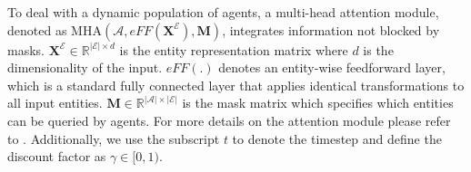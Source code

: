 \documentclass[10pt]{article} %
\begin{document}
To deal with a dynamic population of agents, a multi-head attention module, denoted as $\text{MHA}(\mathcal{A},\textit{eFF}(\mathbf{X}^\mathcal{E}),\mathbf{M})$, integrates information not blocked by masks.
$\mathbf{X}^\mathcal{E} \in \mathbb{R}^{|\mathcal{E}|\times d}$ is the entity representation matrix where $d$ is the dimensionality of the input. $\textit{eFF}(.)$ denotes an entity-wise feedforward layer, which is a standard fully connected layer that applies identical transformations to all input entities.
$\mathbf{M} \in \mathbb{R}^{|\mathcal{A}|\times |\mathcal{E}|}$ is the mask matrix which specifies which entities can be queried by agents. For more details on the attention module please refer to \citep{iqbalsupplementary}. Additionally, we use the subscript $t$ to denote the timestep and define the discount factor as $\gamma \in [0,1)$.
\end{document}
